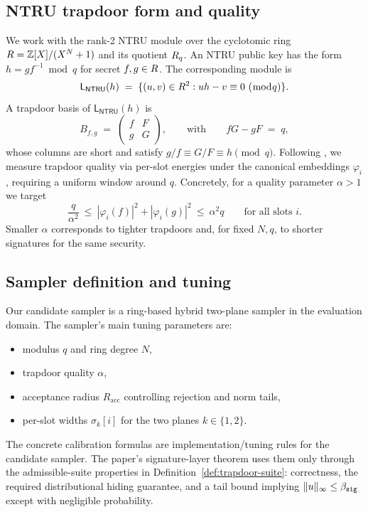 \subsection{NTRU trapdoor form and quality}
\label{subsec:ntru-trapdoor}
We work with the rank-2 NTRU module over the cyclotomic ring \(R=\mathbb{Z}[X]/(X^N+1)\) and its quotient \(R_q\). An NTRU
public key has the form \(h=g f^{-1}\bmod q\) for secret \(f,g\in R\). The corresponding module is
\[
  \mathsf{L}_{\mathsf{NTRU}}(h)
  \;=\;
  \{(u,v)\in R^2 : u h - v \equiv 0 \ (\bmod q)\}.
\]
A trapdoor basis of \(\mathsf{L}_{\mathsf{NTRU}}(h)\) is
\[
  B_{f,g}
  \;=\;
  \begin{pmatrix}
    f & F\\
    g & G
  \end{pmatrix},
  \qquad\text{with}\qquad fG - gF \;=\; q,
\]
whose columns are short and satisfy \(g/f \equiv G/F \equiv h \pmod q\). Following \cite{EPRINT:ENSTW23}, we
measure trapdoor quality via per-slot energies under the canonical embeddings \(\varphi_i\), requiring a uniform window
around \(q\). Concretely, for a quality parameter \(\alpha>1\) we target
\[
  \frac{q}{\alpha^2} \ \le\ |\varphi_i(f)|^2 + |\varphi_i(g)|^2 \ \le\ \alpha^2 q
  \qquad\text{for all slots \(i\)}.
\]
Smaller \(\alpha\) corresponds to tighter trapdoors and, for fixed \(N,q\), to shorter signatures for the same security.

\subsection{Sampler definition and tuning}
\label{subsec:sampler-tuning}
Our candidate sampler is a ring-based hybrid two-plane sampler in the evaluation domain.  The sampler’s main
tuning parameters are:
\begin{itemize}[leftmargin=1.25em]
  \item modulus \(q\) and ring degree \(N\),
  \item trapdoor quality \(\alpha\),
  \item acceptance radius \(R_{\mathrm{acc}}\) controlling rejection and norm tails,
  \item per-slot widths \(\sigma_k[i]\) for the two planes \(k\in\{1,2\}\).
\end{itemize}

The concrete calibration formulas are implementation/tuning rules for the candidate sampler.  The paper's
signature-layer theorem uses them only through the admissible-suite properties in
Definition~\ref{def:trapdoor-suite}: correctness, the required distributional hiding guarantee, and a tail bound
implying \(\|u\|_\infty\le \beta_{\mathtt{sig}}\) except with negligible probability.

